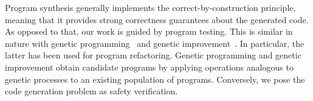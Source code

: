 \documentclass[conference]{IEEEtran}
\begin{document}





Program synthesis generally implements the correct-by-con\-struc\-tion
principle, meaning that it provides strong correctness guarantees about the
generated code.  As opposed to that, our work is guided by program testing. 
This is similar in nature with genetic programming~\cite{Koza92} and genetic
improvement~\cite{DBLP:journals/dagstuhl-reports/PetkeGFL18,7911210}.  In
particular, the latter has been used for program refactoring.  Genetic
programming and genetic improvement obtain candidate programs by applying
operations analogous to genetic processes to an existing population of
programs.  Conversely, we pose the code generation problem as safety
verification.

%
%
\end{document}
